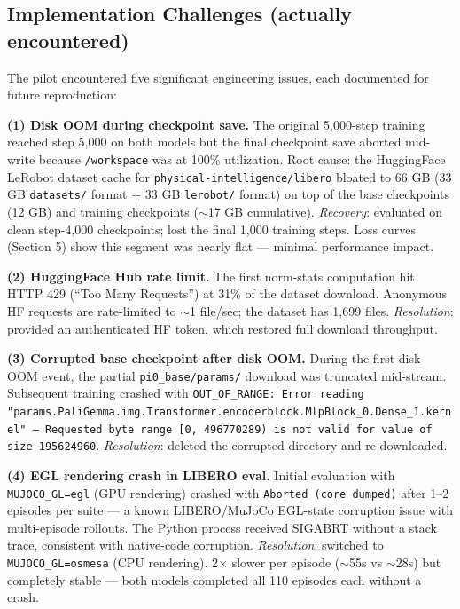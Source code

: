 \documentclass[11pt,letterpaper]{article}
\begin{document}
\subsection{Implementation Challenges (actually encountered)}

The pilot encountered five significant engineering issues, each documented for future reproduction:

\textbf{(1) Disk OOM during checkpoint save.} The original 5{,}000-step training reached step 5{,}000 on both models but the final checkpoint save aborted mid-write because \texttt{/workspace} was at 100\% utilization. Root cause: the HuggingFace LeRobot dataset cache for \texttt{physical-intelligence/libero} bloated to 66 GB (33 GB \texttt{datasets/} format + 33 GB \texttt{lerobot/} format) on top of the base checkpoints (12 GB) and training checkpoints ($\sim$17 GB cumulative). \emph{Recovery}: evaluated on clean step-4{,}000 checkpoints; lost the final 1{,}000 training steps. Loss curves (Section 5) show this segment was nearly flat --- minimal performance impact.

\textbf{(2) HuggingFace Hub rate limit.} The first norm-stats computation hit HTTP 429 (``Too Many Requests'') at 31\% of the dataset download. Anonymous HF requests are rate-limited to $\sim$1 file/sec; the dataset has 1{,}699 files. \emph{Resolution}: provided an authenticated HF token, which restored full download throughput.

\textbf{(3) Corrupted base checkpoint after disk OOM.} During the first disk OOM event, the partial \texttt{pi0\_base/params/} download was truncated mid-stream. Subsequent training crashed with \texttt{OUT\_OF\_RANGE: Error reading "params.PaliGemma.img.Transformer.encoderblock.MlpBlock\_0.Dense\_1.kernel" --- Requested byte range [0, 496770289) is not valid for value of size 195624960}. \emph{Resolution}: deleted the corrupted directory and re-downloaded.

\textbf{(4) EGL rendering crash in LIBERO eval.} Initial evaluation with \texttt{MUJOCO\_GL=egl} (GPU rendering) crashed with \texttt{Aborted (core dumped)} after 1--2 episodes per suite --- a known LIBERO/MuJoCo EGL-state corruption issue with multi-episode rollouts. The Python process received SIGABRT without a stack trace, consistent with native-code corruption. \emph{Resolution}: switched to \texttt{MUJOCO\_GL=osmesa} (CPU rendering). 2$\times$ slower per episode ($\sim$55s vs $\sim$28s) but completely stable --- both models completed all 110 episodes each without a crash.
\end{document}
